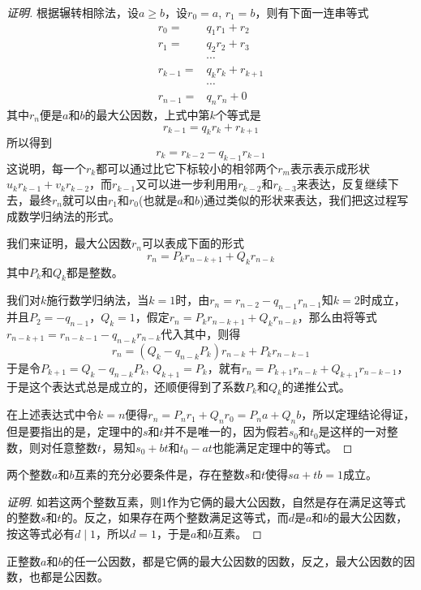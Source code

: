 \begin{proof}[证明]
  根据辗转相除法，设$a \geqslant b$，设$r_0=a$, $r_1=b$，则有下面一连串等式
  \begin{align*}
    r_0 ={}  & q_1r_1 + r_2 \\
    r_1 ={} & q_2r_2 + r_3 \\
    & \cdots \\
    r_{k-1} ={} & q_kr_k + r_{k+1} \\
             & \cdots \\
    r_{n-1} ={} & q_nr_n + 0
  \end{align*}
  其中$r_n$便是$a$和$b$的最大公因数，上式中第$k$个等式是
  \[ r_{k-1} = q_kr_k + r_{k+1} \]
  所以得到
  \[ r_k = r_{k-2}-q_{k-1}r_{k-1} \]
  这说明，每一个$r_k$都可以通过比它下标较小的相邻两个$r_m$表示表示成形状$u_kr_{k-1}+v_kr_{k-2}$，而$r_{k-1}$又可以进一步利用用$r_{k-2}$和$r_{k-3}$来表达，反复继续下去，最终$r_n$就可以由$r_1$和$r_0$(也就是$a$和$b$)通过类似的形状来表达，我们把这过程写成数学归纳法的形式。

  我们来证明，最大公因数$r_n$可以表成下面的形式
  \[ r_n = P_kr_{n-k+1}+Q_kr_{n-k} \]
  其中$P_k$和$Q_k$都是整数。

  我们对$k$施行数学归纳法，当$k=1$时，由$r_n=r_{n-2}-q_{n-1}r_{n-1}$知$k=2$时成立，并且$P_2=-q_{n-1}$，$Q_k=1$，假定$r_n=P_kr_{n-k+1}+Q_kr_{n-k}$，那么由将等式$r_{n-k+1}=r_{n-k-1}-q_{n-k}r_{n-k}$代入其中，则得
  \[ r_n = (Q_k-q_{n-k}P_k)r_{n-k}+P_kr_{n-k-1} \]
  于是令$P_{k+1}=Q_k-q_{n-k}P_k$, $Q_{k+1}=P_k$，就有$r_n=P_{k+1}r_{n-k}+Q_{k+1}r_{n-k-1}$，于是这个表达式总是成立的，还顺便得到了系数$P_k$和$Q_k$的递推公式。

  在上述表达式中令$k=n$便得$r_n=P_nr_1+Q_nr_0=P_na+Q_nb$，所以定理结论得证，但是要指出的是，定理中的$s$和$t$并不是唯一的，因为假若$s_0$和$t_0$是这样的一对整数，则对任意整数$t$，易知$s_0+bt$和$t_0-at$也能满足定理中的等式。
\end{proof}

\begin{inference}
  两个整数$a$和$b$互素的充分必要条件是，存在整数$s$和$t$使得$sa+tb=1$成立。
\end{inference}

\begin{proof}[证明]
  如若这两个整数互素，则1作为它俩的最大公因数，自然是存在满足这等式的整数$s$和$t$的。反之，如果存在两个整数满足这等式，而$d$是$a$和$b$的最大公因数，按这等式必有$d \mid 1$，所以$d=1$，于是$a$和$b$互素。
\end{proof}

\begin{inference}
  正整数$a$和$b$的任一公因数，都是它俩的最大公因数的因数，反之，最大公因数的因数，也都是公因数。
\end{inference}

